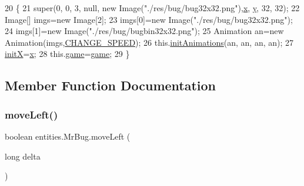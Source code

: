 \begin{DoxyCode}
20                                                                          \{
21         super(0, 0, 3, null, \textcolor{keyword}{new} Image(\textcolor{stringliteral}{"./res/bug/bug32x32.png"}),\mbox{\hyperlink{classorg_1_1newdawn_1_1slick_1_1geom_1_1_shape_a3e985bfff386c15a4efaad03d8ad60d3}{x}}, \mbox{\hyperlink{classorg_1_1newdawn_1_1slick_1_1geom_1_1_shape_a9f934baded6a1b65ebb69e7e5f80ea00}{y}}, 32, 32);
22         Image[] imgs=\textcolor{keyword}{new} Image[2];
23         imgs[0]=\textcolor{keyword}{new} Image(\textcolor{stringliteral}{"./res/bug/bug32x32.png"});
24         imgs[1]=\textcolor{keyword}{new} Image(\textcolor{stringliteral}{"./res/bug/bugbin32x32.png"});
25         Animation an=\textcolor{keyword}{new} Animation(imgs,\mbox{\hyperlink{classentities_1_1_mr_bug_aa5df4742960ee351c233d37596d7c5de}{CHANGE\_SPEED}});
26         this.\mbox{\hyperlink{classentities_1_1_subject_a8f7fce95025c0e91f513879c1f8bbc87}{initAnimations}}(an, an, an, an);
27         \mbox{\hyperlink{classentities_1_1_mr_bug_ab378361709f903878b74eb06b4d84229}{initX}}=\mbox{\hyperlink{classorg_1_1newdawn_1_1slick_1_1geom_1_1_shape_a3e985bfff386c15a4efaad03d8ad60d3}{x}};
28         this.\mbox{\hyperlink{classentities_1_1_mr_bug_a02458a7ed258fc3f99a097cf95bc036e}{game}}=\mbox{\hyperlink{classentities_1_1_mr_bug_a02458a7ed258fc3f99a097cf95bc036e}{game}};
29     \}
\end{DoxyCode}


\subsection{Member Function Documentation}
\mbox{\label{classentities_1_1_mr_bug_ae1876c75b237e09d38c1e71d6d934685}} 
\subsubsection{\texorpdfstring{move\+Left()}{moveLeft()}}
{\footnotesize\ttfamily boolean entities.\+Mr\+Bug.\+move\+Left (\begin{DoxyParamCaption}\item[{long}]{delta }\end{DoxyParamCaption})\hspace{0.3cm}{\ttfamily [inline]}}


